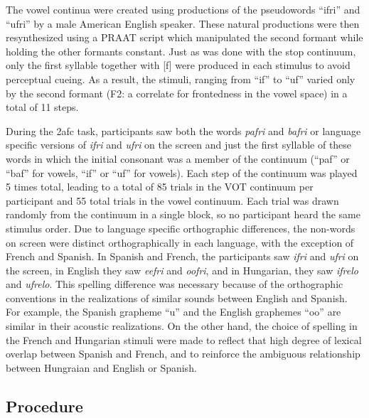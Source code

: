 \documentclass[
  english,
  man]{apa6}
\begin{document}
The vowel continua were created using productions of the pseudowords ``ifri'' and ``ufri'' by a male American English speaker. These natural productions were then resynthesized using a PRAAT script which manipulated the second formant while holding the other formants constant.
Just as was done with the stop continuum, only the first syllable together with {[}f{]} were produced in each stimulus to avoid perceptual cueing. As a result, the stimuli, ranging from ``if'' to ``uf'' varied only by the second formant (F2: a correlate for frontedness in the vowel space) in a total of 11 steps.

During the 2afc task, participants saw both the words \emph{pafri} and \emph{bafri} or language specific versions of \emph{ifri} and \emph{ufri} on the screen and just the first syllable of these words in which the initial consonant was a member of the continuum (``paf'' or ``baf'' for vowels, ``if'' or ``uf'' for vowels).
Each step of the continuum was played 5 times total, leading to a total of 85 trials in the VOT continuum per participant and 55 total trials in the vowel continuum.
Each trial was drawn randomly from the continuum in a single block, so no participant heard the same stimulus order.
Due to language specific orthographic differences, the non-words on screen were distinct orthographically in each language, with the exception of French and Spanish.
In Spanish and French, the participants saw \emph{ifri} and \emph{ufri} on the screen, in English they saw \emph{eefri} and \emph{oofri}, and in Hungarian, they saw \emph{ifrelo} and \emph{ufrelo}. This spelling difference was necessary because of the orthographic conventions in the realizations of similar sounds between English and Spanish. For example, the Spanish grapheme ``u'' and the English graphemes ``oo'' are similar in their acoustic realizations. On the other hand, the choice of spelling in the French and Hungarian stimuli were made to reflect that high degree of lexical overlap between Spanish and French, and to reinforce the ambiguous relationship between Hungraian and English or Spanish.

\hypertarget{procedure}{%
\subsection{Procedure}\label{procedure}}
\end{document}
